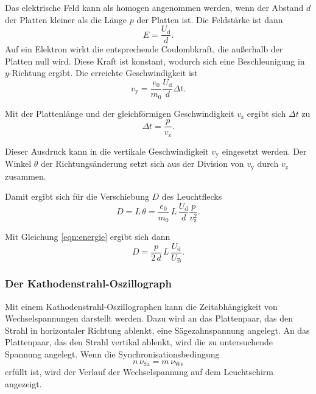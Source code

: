\noindent 
Das elektrische Feld kann als homogen angenommen werden,
wenn der Abstand $d$ der Platten kleiner als die Länge $p$
der Platten ist.
Die Feldstärke ist dann
\begin{equation*}
    E = \frac{U_\text{d}}{d}.
\end{equation*}
Auf ein Elektron wirkt die entsprechende Coulombkraft, 
die außerhalb der Platten null wird. Diese Kraft ist konstant, 
wodurch sich eine Beschleunigung in $y$-Richtung  
ergibt. 
Die erreichte Geschwindigkeit ist 
\begin{equation*}
    v_\text{y} = \frac{e_\text{0}}{m_\text{0}} \frac{U_\text{d}}{d} \Delta t.
\end{equation*}

\noindent Mit der Plattenlänge und der 
gleichförmigen Geschwindigkeit $v_\text{z}$ ergibt sich $\Delta t$ zu
\begin{equation*}
    \Delta t = \frac{p}{v_\text{z}}.
\end{equation*}

\noindent Dieser Ausdruck kann in die vertikale 
Geschwindigkeit $v_\text{y}$ eingesetzt werden. Der Winkel $\theta$ der 
Richtungsänderung setzt sich aus der Division von 
$v_\text{y}$ durch $v_\text{z}$ zusammen. 

\noindent Damit ergibt sich für die Verschiebung $D$ des Leuchtflecks 
\begin{equation*}
    D = L \, \theta = \frac{e_\text{0}}{m_\text{0}} \, L \, \frac{U_\text{d}}{d} \frac{p}{v_\text{z}^2}.
\end{equation*}

\noindent Mit Gleichung \eqref{eqn:energie} ergibt sich dann 
\begin{equation}
    D = \frac{p}{2\, d} \, L \, \frac{U_\text{d}}{U_\text{B}}.
    \label{eqn:leuchtfleck}
\end{equation}

\subsubsection{Der Kathodenstrahl-Oszillograph}
Mit einem Kathodenstrahl-Oszillographen kann die Zeitabhängigkeit
von Wechselspannungen darstellt werden.
Dazu wird an das Plattenpaar, das den Strahl in horizontaler
Richtung ablenkt, eine Sägezahnspannung angelegt. An das Plattenpaar,
das den Strahl vertikal ablenkt, wird die zu untersuchende
Spannung angelegt. Wenn die Synchronisationsbedingung
\begin{equation*}
    n \, \nu_\text{Sä} = m \, \nu_\text{We}
\end{equation*}
erfüllt ist, wird der Verlauf der Wechselspannung auf dem
Leuchtschirm angezeigt.


